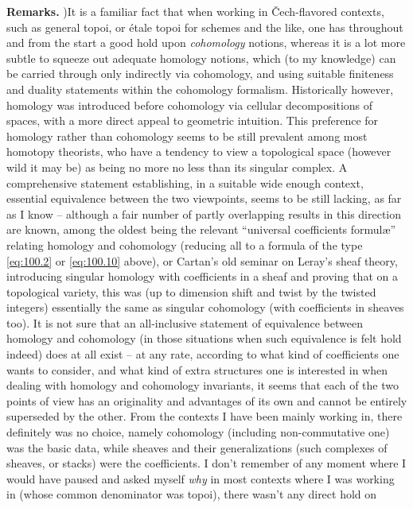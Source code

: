 \noindent\textbf{Remarks.} )\enspace It is a familiar fact that when
working in \v Cech-flavored contexts, such as general topoi, or étale
topoi for schemes and the like, one has throughout and from the start
a good hold upon \emph{cohomology} notions, whereas it is a lot more
subtle to squeeze out adequate homology notions, which (to my
knowledge) can be carried through only indirectly via cohomology, and
using suitable finiteness and duality statements within the cohomology
formalism. Historically however, homology was introduced before
cohomology via cellular decompositions of spaces, with a more direct
appeal to geometric intuition. This preference for homology rather
than cohomology seems to be still prevalent among most homotopy
theorists, who have a tendency to view a topological space (however
wild it may be) as being no more no less than its singular complex. A
comprehensive statement establishing, in a suitable wide enough
context, essential equivalence between the two viewpoints, seems to be
still lacking, as far as I know -- although a fair number
of partly overlapping results in this direction are known, among the
oldest being the relevant ``universal coefficients formulæ'' relating
homology and cohomology (reducing all to a formula of the type
\eqref{eq:100.2} or \eqref{eq:100.10} above), or Cartan's old seminar
on Leray's sheaf theory, introducing singular homology with
coefficients in a sheaf and proving that on a topological variety,
this was (up to dimension shift and twist by the twisted integers)
essentially the same as singular cohomology (with coefficients in
sheaves too). It is not sure that an all-inclusive statement of
equivalence between homology and cohomology (in those situations when
such equivalence is felt hold indeed) does at all exist -- at any
rate, according to what kind of coefficients one wants to consider,
and what kind of extra structures one is interested in when dealing
with homology and cohomology invariants, it seems that each of the two
points of view has an originality and advantages of its own and cannot
be entirely superseded by the other. From the contexts I have been
mainly working in, there definitely was no choice, namely cohomology
(including non-commutative one) was the basic data, while sheaves and
their generalizations (such complexes of sheaves, or stacks) were the
coefficients. I don't remember of any moment where I would have paused
and asked myself \emph{why} in most contexts where I was working in
(whose common denominator was topoi), there wasn't any direct hold on
